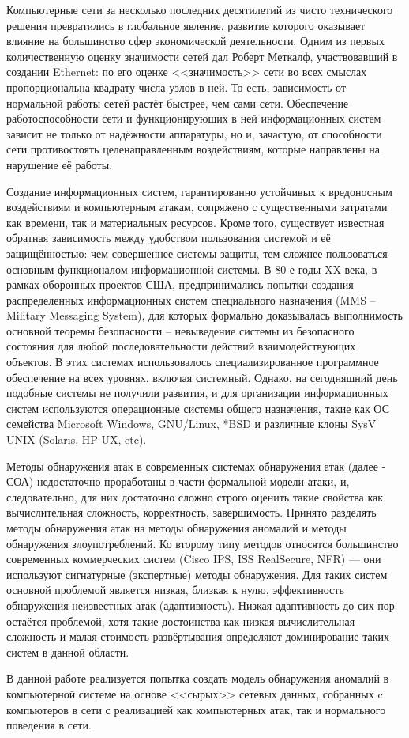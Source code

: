 Компьютерные сети за несколько последних десятилетий из чисто технического решения превратились в глобальное явление, развитие которого оказывает влияние на большинство сфер экономической деятельности. Одним из первых количественную оценку значимости сетей дал Роберт Меткалф, участвовавший в создании Ethernet: по его оценке <<значимость>> сети во всех смыслах пропорциональна квадрату числа узлов в ней. То есть, зависимость от нормальной работы сетей растёт быстрее, чем сами сети. Обеспечение работоспособности сети и функционирующих в ней информационных систем зависит не только от надёжности аппаратуры, но и, зачастую, от способности сети противостоять целенаправленным воздействиям, которые направлены на нарушение её работы.

Создание информационных систем, гарантированно устойчивых к вредоносным воздействиям и компьютерным атакам, сопряжено с существенными затратами как времени, так и материальных ресурсов. Кроме того, существует известная обратная зависимость между удобством пользования системой и её защищённостью: чем совершеннее системы защиты, тем сложнее пользоваться основным функционалом информационной системы. В 80-е годы XX века, в рамках оборонных проектов США, предпринимались попытки создания распределенных информационных систем специального назначения (MMS – Military Messaging System), для которых формально доказывалась выполнимость основной теоремы безопасности – невыведение системы из безопасного состояния для любой последовательности действий взаимодействующих объектов. В этих системах использовалось специализированное программное обеспечение на всех уровнях, включая системный. Однако, на сегодняшний день подобные системы не получили развития, и для организации информационных систем используются операционные системы общего назначения, такие как ОС семейства Microsoft Windows, GNU/Linux, *BSD и различные клоны SysV UNIX (Solaris, HP-UX, etc).

Методы обнаружения атак в современных системах обнаружения атак (далее - СОА) недостаточно проработаны в части формальной модели атаки, и, следовательно, для них достаточно сложно строго оценить такие свойства как вычислительная сложность, корректность, завершимость. Принято разделять методы обнаружения атак на методы обнаружения аномалий и методы обнаружения злоупотреблений. Ко второму типу методов относятся большинство современных коммерческих систем (Cisco IPS, ISS RealSecure, NFR) --- они используют сигнатурные (экспертные) методы обнаружения. Для таких систем основной проблемой является низкая, близкая к нулю, эффективность обнаружения неизвестных атак (адаптивность). Низкая адаптивность до сих пор остаётся проблемой, хотя такие достоинства как низкая вычислительная сложность и малая стоимость развёртывания определяют доминирование таких систем в данной области.

В данной работе реализуется попытка создать модель обнаружения аномалий в компьютерной системе на основе <<сырых>> сетевых данных, собранных c компьютеров в сети с реализацией как компьютерных атак, так и нормального поведения в сети.
